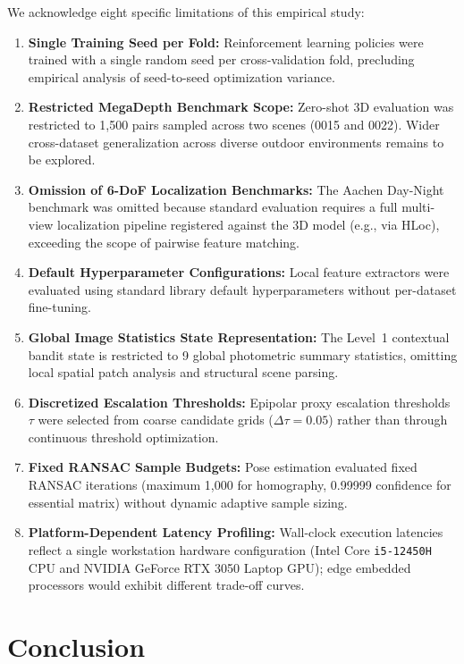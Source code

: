 \documentclass[conference]{IEEEtran}
\begin{document}
We acknowledge eight specific limitations of this empirical study:
\begin{enumerate}
    \item \textbf{Single Training Seed per Fold:} Reinforcement learning policies were trained with a single random seed per cross-validation fold, precluding empirical analysis of seed-to-seed optimization variance.
    \item \textbf{Restricted MegaDepth Benchmark Scope:} Zero-shot 3D evaluation was restricted to 1,500 pairs sampled across two scenes (0015 and 0022). Wider cross-dataset generalization across diverse outdoor environments remains to be explored.
    \item \textbf{Omission of 6-DoF Localization Benchmarks:} The Aachen Day-Night benchmark was omitted because standard evaluation requires a full multi-view localization pipeline registered against the 3D model (e.g., via HLoc), exceeding the scope of pairwise feature matching.
    \item \textbf{Default Hyperparameter Configurations:} Local feature extractors were evaluated using standard library default hyperparameters without per-dataset fine-tuning.
    \item \textbf{Global Image Statistics State Representation:} The Level~1 contextual bandit state is restricted to 9 global photometric summary statistics, omitting local spatial patch analysis and structural scene parsing.
    \item \textbf{Discretized Escalation Thresholds:} Epipolar proxy escalation thresholds $\tau$ were selected from coarse candidate grids ($\Delta\tau = 0.05$) rather than through continuous threshold optimization.
    \item \textbf{Fixed RANSAC Sample Budgets:} Pose estimation evaluated fixed RANSAC iterations (maximum 1,000 for homography, 0.99999 confidence for essential matrix) without dynamic adaptive sample sizing.
    \item \textbf{Platform-Dependent Latency Profiling:} Wall-clock execution latencies reflect a single workstation hardware configuration (Intel Core \texttt{i5-12450H} CPU and NVIDIA GeForce RTX 3050 Laptop GPU); edge embedded processors would exhibit different trade-off curves.
\end{enumerate}

\section{Conclusion}
\label{sec:conclusion}
\end{document}
